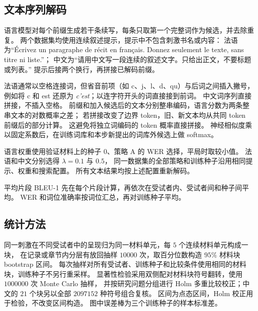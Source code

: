 \begin{table}[htbp]
    \centering
    \papertablestyle
    \caption{各模型的输入与训练设置。范围相对于目标词给出。独立 K2 与局部半径 $2$ 的输入和监督相同，使用同一个检查点。}
    \label{tab:model_settings}
    
\end{table}


\subsection{文本序列解码}
\label{sec:supp_sentence_settings}

语言模型对每个前缀生成若干条续写，每条只取第一个完整词作为候选，并去除重复。
两个数据集均使用连续叙述提示，提示中不包含刺激书名或内容：
法语为“Écrivez un paragraphe de récit en français. Donnez seulement le texte, sans titre ni liste.”；
中文为“请用中文写一段连续的叙述文字。只给出正文，不要标题或列表。”
提示后接两个换行，再拼接已解码前缀。

法语通常以空格连接词，但省音前项（如 c、j、l、d、qu）与后词之间插入撇号，
例如将 c 和 est 还原为 \textit{c'est}；以连字符开头的词直接接到前词。
中文词序列直接拼接，不插入空格。
前缀和加入候选后的文本分别整串编码，语言分数为两条整串文本的对数概率之差；
若拼接改变了边界 token，旧、新文本均从共同 token 前缀后的部分计算。
这避免将独立词编码的 token 概率直接拼接。
神经相似度乘以固定系数后，在训练词库和本步新提出的词库外候选上做 softmax。

语言权重使用验证材料上的种子 $0$、策略 A 的 WER 选择，平局时取较小值。
法语和中文分别选得 $\lambda=0.1$ 与 $0.5$，
同一数据集的全部策略和训练种子沿用相同提示、权重和搜索配置。
所有文本结果均按上述配置重新解码。

\begin{table}[!htbp]
    \centering
    \papertablestyle
    \caption{文本序列解码参数。两个数据集的语言权重分别选择；其余参数相同。}
    \label{tab:sentence_decoder_settings}
    
\end{table}

平均片段 BLEU-1 先在每个片段计算，再依次在受试者内、受试者间和种子间平均。
WER 和词位准确率按词位汇总，再对训练种子平均。

\subsection{统计方法}
\label{sec:statistics}
\label{sec:supp_statistics}

同一刺激在不同受试者中的呈现归为同一材料单元，每 $5$ 个连续材料单元构成一块，
在记录或章节内分层有放回抽样 $10000$ 次，取百分位数构造 $95\%$ 材料块 bootstrap 区间。
每次抽样对所有受试者、训练种子和比较条件使用相同的材料块，训练种子不另行重采样。
显著性检验采用双侧配对材料块符号翻转，使用 $1000000$ 次 Monte Carlo 抽样，
并按研究问题分组进行 Holm 多重比较校正；中文的 $21$ 个块另以全部 $2097152$ 种符号组合复核。
区间为点态区间，Holm 校正用于检验，不改变区间构造。
图中误差棒为三个训练种子的样本标准差。

